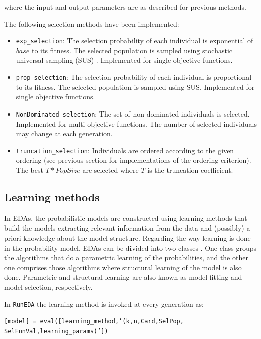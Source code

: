 \documentclass[a4paper]{article}
\begin{document}
where the input and output parameters are as described for previous
methods.

The following selection methods have been  implemented:

\begin{itemize}
 \item \texttt{exp\_selection}: The selection probability of each individual is exponential  of $base$ to its fitness. The selected population is sampled using stochastic
 universal sampling (SUS) \cite{Baker:1987}. Implemented for single objective functions.
 \item \texttt{prop\_selection}: The selection probability of each individual is proportional to its fitness.
  The selected population is sampled using SUS. Implemented for single objective functions.
 \item \texttt{NonDominated\_selection}: The set of non dominated individuals is selected.
 Implemented for multi-objective functions. The number of selected
 individuals may change at each generation.
 \item \texttt{truncation\_selection}: Individuals are ordered according to the given
 ordering (see previous section for implementations of the ordering
 criterion). The best $T*PopSize$ are selected where $T$ is the truncation coefficient.
\end{itemize}



\subsection{Learning methods} \label{sec:LEARNMETHODS}

  In EDAs, the probabilistic models are constructed using learning
  methods that build the models extracting relevant information
  from the data and (possibly) a priori knowledge about the model
  structure.  Regarding the way learning is done
   in the probability model, EDAs can be divided into two classes \cite{Larranhaga:2002a}. One class groups the algorithms that
   do a parametric learning of the probabilities, and the other one comprises
   those  algorithms where  structural learning of the model is
   also done. Parametric and  structural learning are also known as model fitting
   and model selection, respectively.


In  \texttt{RunEDA} the learning method  is invoked at every
generation as:

  \texttt{[model] = eval([learning\_method,'(k,n,Card,SelPop,\\
  SelFunVal,learning\_params)'])}
\end{document}
